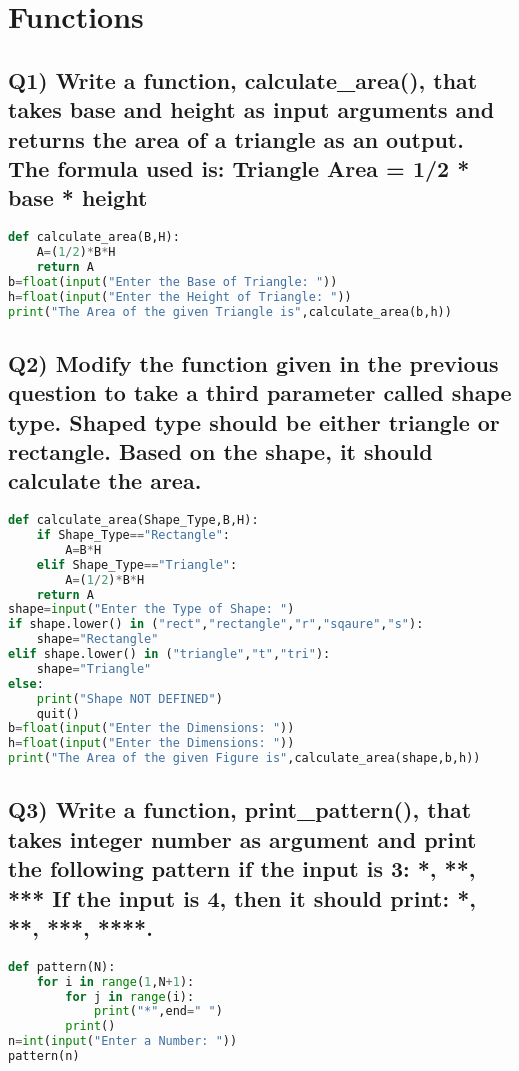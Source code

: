 \documentclass{article}
\begin{document}
\section{Functions}

\subsection*{Q1) Write a function, calculate\_area(), that takes base and height as input arguments and returns the area of a triangle as an output. The formula used is: Triangle Area = 1/2 * base * height}
\begin{lstlisting}[language=Python]
def calculate_area(B,H):
    A=(1/2)*B*H
    return A
b=float(input("Enter the Base of Triangle: "))
h=float(input("Enter the Height of Triangle: "))
print("The Area of the given Triangle is",calculate_area(b,h))
\end{lstlisting}

\subsection*{Q2) Modify the function given in the previous question to take a third parameter called shape type. Shaped type should be either triangle or rectangle. Based on the shape, it should calculate the area.}
\begin{lstlisting}[language=Python]
def calculate_area(Shape_Type,B,H):
    if Shape_Type=="Rectangle":
        A=B*H
    elif Shape_Type=="Triangle":
        A=(1/2)*B*H
    return A
shape=input("Enter the Type of Shape: ")
if shape.lower() in ("rect","rectangle","r","sqaure","s"):
    shape="Rectangle"
elif shape.lower() in ("triangle","t","tri"):
    shape="Triangle"
else:
    print("Shape NOT DEFINED")
    quit()
b=float(input("Enter the Dimensions: "))
h=float(input("Enter the Dimensions: "))
print("The Area of the given Figure is",calculate_area(shape,b,h))
\end{lstlisting}

\subsection*{Q3) Write a function, print\_pattern(), that takes integer number as argument and print the following pattern if the input is 3: *, **, *** If the input is 4, then it should print: *, **, ***, ****.}
\begin{lstlisting}[language=Python]
def pattern(N):
    for i in range(1,N+1):
        for j in range(i):
            print("*",end=" ")
        print()
n=int(input("Enter a Number: "))
pattern(n)
\end{lstlisting}
\end{document}
